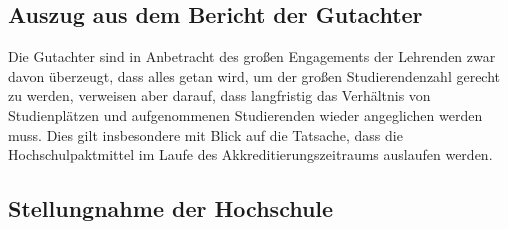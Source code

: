 \subsection{Auszug aus dem Bericht der
Gutachter\label{/mi-2017/selbstbericht/auflagen/0000-auflagen}}\label{auszug-aus-dem-bericht-der-gutachterpathlabelmi-2017selbstberichtauflagen0000-auflagen-5}

\begin{siderules}
Die Gutachter sind in Anbetracht des großen Engagements der Lehrenden
zwar davon überzeugt, dass alles getan wird, um der großen
Studierendenzahl gerecht zu werden, verweisen aber darauf, dass
langfristig das Verhältnis von Studienplätzen und aufgenommenen
Studierenden wieder angeglichen werden muss. Dies gilt insbesondere mit
Blick auf die Tatsache, dass die Hochschulpaktmittel im Laufe des
Akkreditierungszeitraums auslaufen werden.
\end{siderules}

\subsection{Stellungnahme der
Hochschule\label{/mi-2017/selbstbericht/auflagen/0000-auflagen}}\label{stellungnahme-der-hochschulepathlabelmi-2017selbstberichtauflagen0000-auflagen-4}

